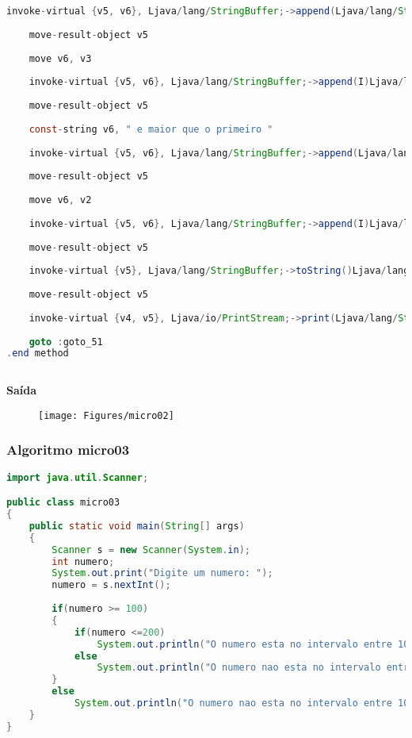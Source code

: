 \documentclass[hidelinks,12pt]{article}
\begin{document}
\begin{lstlisting}[caption=Smali resultante do .java,language=java]
	invoke-virtual {v5, v6}, Ljava/lang/StringBuffer;->append(Ljava/lang/String;)Ljava/lang/StringBuffer;
	
	move-result-object v5
	
	move v6, v3
	
	invoke-virtual {v5, v6}, Ljava/lang/StringBuffer;->append(I)Ljava/lang/StringBuffer;
	
	move-result-object v5
	
	const-string v6, " e maior que o primeiro "
	
	invoke-virtual {v5, v6}, Ljava/lang/StringBuffer;->append(Ljava/lang/String;)Ljava/lang/StringBuffer;
	
	move-result-object v5
	
	move v6, v2
	
	invoke-virtual {v5, v6}, Ljava/lang/StringBuffer;->append(I)Ljava/lang/StringBuffer;
	
	move-result-object v5
	
	invoke-virtual {v5}, Ljava/lang/StringBuffer;->toString()Ljava/lang/String;
	
	move-result-object v5
	
	invoke-virtual {v4, v5}, Ljava/io/PrintStream;->print(Ljava/lang/String;)V
	
	goto :goto_51
.end method	
	
	\end{lstlisting}
	
	{\large{\textbf{Saída}}}
	
	\begin{figure}[!h]
		\centering
		\texttt{[image: Figures/micro02]}
	\end{figure}
	
	\newpage
	\subsubsection{Algoritmo micro03}
	
	\begin{lstlisting}[caption=Código em Java,language=java]
import java.util.Scanner;

public class micro03
{
	public static void main(String[] args)
	{
		Scanner s = new Scanner(System.in);
		int numero;
		System.out.print("Digite um numero: ");
		numero = s.nextInt();
		
		if(numero >= 100)
		{
			if(numero <=200)
				System.out.println("O numero esta no intervalo entre 100 e 200");
			else
				System.out.println("O numero nao esta no intervalo entre 100 e 200");
		}
		else
			System.out.println("O numero nao esta no intervalo entre 100 e 200");
	}
}		
		
	\end{lstlisting}
	
\end{document}
